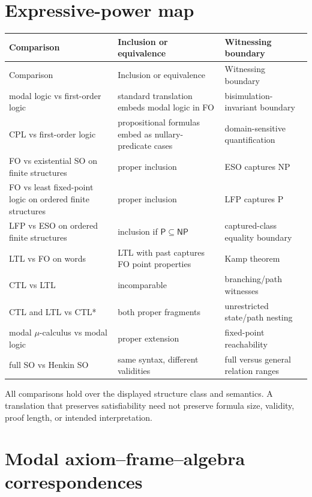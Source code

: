 \section{Expressive-power map}
\label{sec:p14-expressive-table}

\begin{longtable}{@{}p{}p{}p{}@{}}
\toprule
Comparison & Inclusion or equivalence & Witnessing boundary \\
\midrule
\endfirsthead
\toprule
Comparison & Inclusion or equivalence & Witnessing boundary \\
\midrule
\endhead
modal logic vs first-order logic & standard translation embeds modal logic in FO & bisimulation-invariant boundary \cite{VanBenthem1983} \\
CPL vs first-order logic & propositional formulas embed as nullary-predicate cases & domain-sensitive quantification \cite{Enderton2001} \\
FO vs existential SO on finite structures & proper inclusion & ESO captures NP \cite{Fagin1974} \\
FO vs least fixed-point logic on ordered finite structures & proper inclusion & LFP captures P \cite{Immerman1986} \\
LFP vs ESO on ordered finite structures & inclusion if \(\mathsf P\subseteq\mathsf{NP}\) & captured-class equality boundary \cite{Immerman1999} \\
LTL vs FO on words & LTL with past captures FO point properties & Kamp theorem \cite{Kamp1968} \\
CTL vs LTL & incomparable & branching/path witnesses \cite{EmersonHalpern1986} \\
CTL and LTL vs CTL* & both proper fragments & unrestricted state/path nesting \cite{EmersonHalpern1986} \\
modal \(\mu\)-calculus vs modal logic & proper extension & fixed-point reachability \cite{Kozen1983} \\
full SO vs Henkin SO & same syntax, different validities & full versus general relation ranges \cite{Henkin1950,Shapiro1991} \\
\bottomrule
\end{longtable}

All comparisons hold over the displayed structure class and semantics. A
translation that preserves satisfiability need not preserve formula size,
validity, proof length, or intended interpretation.

\section{Modal axiom--frame--algebra correspondences}
\label{sec:p14-modal-correspondence}

